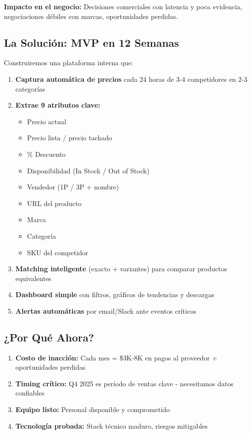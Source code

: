 \documentclass[12pt,a4paper]{article}
\begin{document}
\textbf{Impacto en el negocio:} Decisiones comerciales con latencia y poca evidencia, negociaciones débiles con marcas, oportunidades perdidas.

\subsection{La Solución: MVP en 12 Semanas}

Construiremos una plataforma interna que:

\begin{enumerate}[leftmargin=*]
    \item \textbf{Captura automática de precios} cada 24 horas de 3-4 competidores en 2-3 categorías
    \item \textbf{Extrae 9 atributos clave:}
    \begin{itemize}
        \item Precio actual
        \item Precio lista / precio tachado
        \item \% Descuento
        \item Disponibilidad (In Stock / Out of Stock)
        \item Vendedor (1P / 3P + nombre)
        \item URL del producto
        \item Marca
        \item Categoría
        \item SKU del competidor
    \end{itemize}
    \item \textbf{Matching inteligente} (exacto + variantes) para comparar productos equivalentes
    \item \textbf{Dashboard simple} con filtros, gráficos de tendencias y descargas
    \item \textbf{Alertas automáticas} por email/Slack ante eventos críticos
\end{enumerate}

\subsection{¿Por Qué Ahora?}

\begin{enumerate}[leftmargin=*]
    \item \textbf{Costo de inacción:} Cada mes = \$3K-8K en pagos al proveedor + oportunidades perdidas
    \item \textbf{Timing crítico:} Q4 2025 es período de ventas clave - necesitamos datos confiables
    \item \textbf{Equipo listo:} Personal disponible y comprometido
    \item \textbf{Tecnología probada:} Stack técnico maduro, riesgos mitigables
\end{enumerate}
\end{document}
